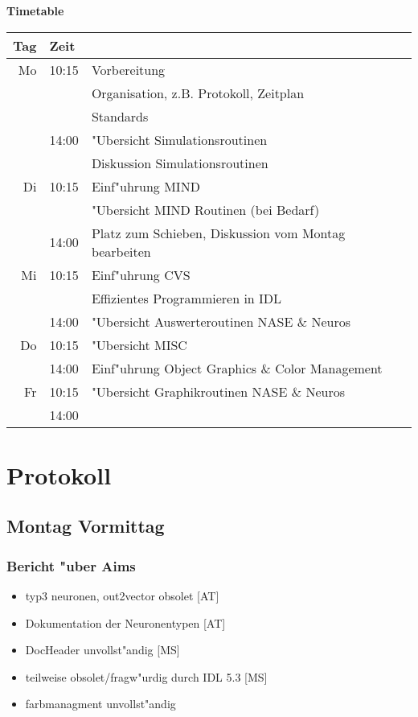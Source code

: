 \documentclass[12pt]{article}
\begin{document}
\begin{center}
{\Huge\textbf{Timetable}}\\[2cm]

\begin{tabular}{|r|l|l|}  \hline
  Tag & Zeit  & \\ 
\hline\hline
  Mo & 10:15 & Vorbereitung\\
  & & Organisation, z.B. Protokoll, Zeitplan\\
  & & Standards\\
  & 14:00 & "Ubersicht Simulationsroutinen\\
  & & Diskussion Simulationsroutinen\\
\hline\hline
  Di & 10:15 & Einf"uhrung MIND\\ 
     &       & "Ubersicht MIND Routinen (bei Bedarf)\\ 
     & 14:00 & Platz zum Schieben, Diskussion vom Montag bearbeiten\\ 
\hline\hline
  Mi & 10:15 & Einf"uhrung CVS\\
     &       & Effizientes Programmieren in IDL\\
     & 14:00 & "Ubersicht Auswerteroutinen NASE \& Neuros\\
\hline\hline
  Do & 10:15 & "Ubersicht MISC \\
     & 14:00 & Einf"uhrung Object Graphics \& Color Management \\ \hline\hline
  Fr & 10:15 & "Ubersicht Graphikroutinen NASE \& Neuros\\
     & 14:00 &  \\ \hline
\end{tabular}

\end{center}



\section{Protokoll}

\subsection{Montag Vormittag}

\subsubsection{Bericht "uber Aims}
\begin{itemize}
\item typ3 neuronen, out2vector obsolet [AT]
\item Dokumentation der Neuronentypen [AT]
\item DocHeader unvollst"andig [MS]
\item teilweise obsolet/fragw"urdig durch IDL 5.3 [MS]
\item farbmanagment unvollst"andig
\end{itemize}



%
% 
\end{document}
